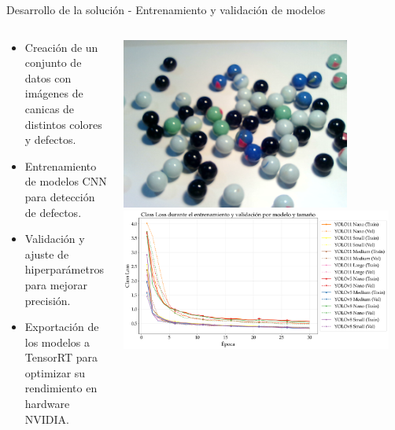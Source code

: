 \documentclass[spanish]{beamer}
\begin{document}
\begin{frame}{Desarrollo de la solución - Entrenamiento y validación de modelos}
    \begin{columns}
        \begin{column}{0.5\textwidth}
            \begin{itemize}
                \item Creación de un conjunto de datos con imágenes de canicas de distintos colores y defectos.
                \item Entrenamiento de modelos CNN para detección de defectos.
                \item Validación y ajuste de hiperparámetros para mejorar precisión.
                \item Exportación de los modelos a TensorRT para optimizar su rendimiento en hardware NVIDIA.
            \end{itemize}
        \end{column}
        \begin{column}{0.5\textwidth}
            \begin{center}
                \includegraphics[width=0.8\textwidth]{images/solucion_propuesta/ejemplo_canicas.png}
                \includegraphics[width=0.95\textwidth]{images/solucion_propuesta/loss_plot.pdf}
            \end{center}
        \end{column}
    \end{columns}
\end{frame}
\end{document}
